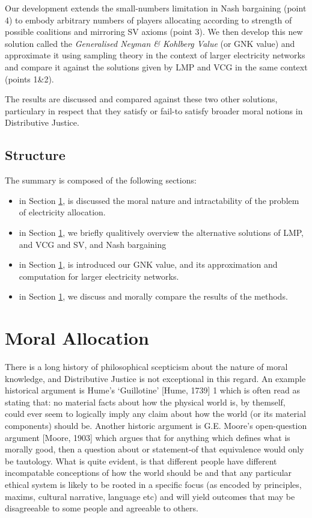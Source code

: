 \documentclass[
10pt, %
a4paper, %
oneside, %
headinclude,footinclude, %
BCOR5mm, %
]{scrartcl}
\begin{document}
Our development extends the small-numbers limitation in Nash bargaining (point 4) to embody arbitrary numbers of players allocating according to strength of possible coalitions and mirroring SV axioms (point 3).
We then develop this new solution called the \textit{Generalised Neyman \& Kohlberg Value} (or GNK value) and approximate it using sampling theory in the context of larger electricity networks and compare it against the solutions given by LMP and VCG in the same context (points 1\&2).

The results are discussed and compared against these two other solutions, particulary in respect that they satisfy or fail-to satisfy broader moral notions in Distributive Justice.

\subsection{Structure}
The summary is composed of the following sections:

\begin{itemize}[noitemsep]
\item	in Section \ref{}, is discussed the moral nature and intractability of the problem of electricity allocation.
\item	in Section \ref{}, we briefly qualitively overview the alternative solutions of LMP, and VCG and SV, and Nash bargaining
\item	in Section \ref{}, is introduced our GNK value, and its approximation and computation for larger electricity networks.
\item	in Section \ref{}, we discuss and morally compare the results of the methods.
\end{itemize}

\section{Moral Allocation}

There is a long history of philosophical scepticism about the nature of moral knowledge, and Distributive Justice is not exceptional in this regard.
An example historical argument is Hume’s ‘Guillotine’ [Hume, 1739] 1 which is often read as stating that: no material facts about how the physical world is, by themself, could ever seem to logically imply any claim about how the world (or its material components) should be.
Another historic argument is G.E. Moore’s open-question argument [Moore, 1903] which argues that for anything which defines what is morally good, then a question about or statement-of that equivalence would only be tautology.
What is quite evident, is that different people have different incompatable conceptions of how the world should be and that any particular ethical system is likely to be rooted in a specific focus (as encoded by principles, maxims, cultural narrative, language etc) and will yield outcomes that may be disagreeable to some people and agreeable to others.
\end{document}
